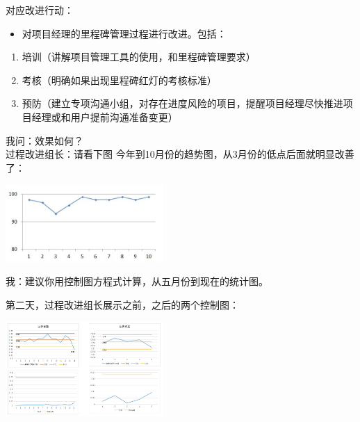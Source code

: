 对应改进行动：

\begin{itemize}
\tightlist
\item
  对项目经理的里程碑管理过程进行改进。包括：
\end{itemize}

\begin{enumerate}
\tightlist
\item
  培训（讲解项目管理工具的使用，和里程碑管理要求）
\item
  考核（明确如果出现里程碑红灯的考核标准）
\item
  预防（建立专项沟通小组，对存在进度风险的项目，提醒项目经理尽快推进项目经理或和用户提前沟通准备变更）
\end{enumerate}

我问：效果如何？\\
过程改进组长：请看下图
今年到10月份的趋势图，从3月份的低点后面就明显改善了：


\includegraphics[width=6cm]{M3_CC_figure1.jpg}

我：建议你用控制图方程式计算，从五月份到现在的统计图。

第二天，过程改进组长展示之前，之后的两个控制图：

\begin{description}
\item[]
\end{description}


\includegraphics[width=6cm]{控制图0.jpg}

